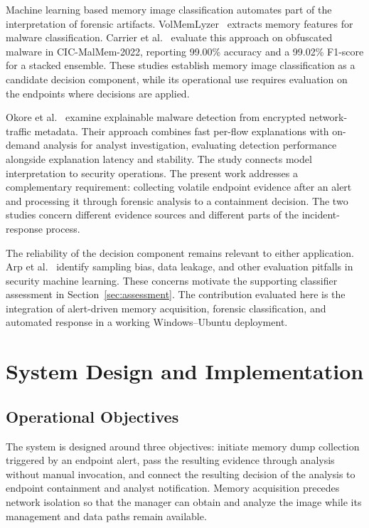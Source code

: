 \documentclass[conference]{IEEEtran}
\begin{document}
Machine learning based memory image classification automates part of the interpretation of
forensic artifacts. VolMemLyzer~\cite{lashkari2021} extracts memory features
for malware classification. Carrier et al.~\cite{carrier2022} evaluate this
approach on obfuscated malware in CIC-MalMem-2022, reporting 99.00\% accuracy
and a 99.02\% F1-score for a stacked ensemble. These studies establish
memory image classification as a candidate decision component, while its
operational use requires evaluation on the endpoints where decisions are
applied.

Okore et al.~\cite{okore2026} examine explainable malware detection from
encrypted network-traffic metadata. Their approach combines fast per-flow
explanations with on-demand analysis for analyst investigation, evaluating
detection performance alongside explanation latency and stability. The study
connects model interpretation to security operations. The present work
addresses a complementary requirement: collecting volatile endpoint evidence
after an alert and processing it through forensic analysis to a containment
decision. The two studies concern different evidence sources and different
parts of the incident-response process.

The reliability of the decision component remains relevant to either
application. Arp et al.~\cite{arp2022} identify sampling bias, data leakage,
and other evaluation pitfalls in security machine learning. These concerns
motivate the supporting classifier assessment in Section~\ref{sec:assessment}.
The contribution evaluated here is the integration of alert-driven memory
acquisition, forensic classification, and automated response in a working
Windows--Ubuntu deployment.

\section{System Design and Implementation}
\label{sec:architecture}

\subsection{Operational Objectives}
The system is designed around three objectives: initiate memory dump collection triggered by an endpoint alert, pass the resulting evidence through analysis without manual invocation, and connect the resulting decision of the analysis to endpoint containment and analyst notification. Memory acquisition precedes network isolation so that the manager can obtain and analyze the image while its management and data paths remain available. 
\end{document}
